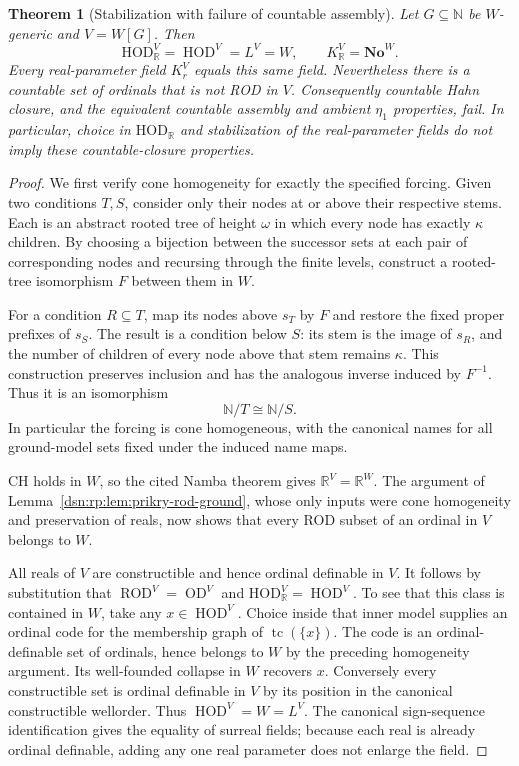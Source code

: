 \documentclass[11pt,a4paper]{article}
\numberwithin{equation}{section}
\newtheorem{theorem}{Theorem}[section]
\theoremstyle{definition}
\theoremstyle{remark}
\newcommand{\No}{\mathbf{No}}
\newcommand{\HOD}{\mathrm{HOD}}
\newcommand{\R}{\mathbb R}
\newcommand{\HR}{\HOD_{\R}}
\newcommand{\KR}{K_{\R}}
\begin{document}
\begin{theorem}[Stabilization with failure of countable assembly]
\label{dsn:rp:thm:namba}
Let $G\subseteq\mathbb N$ be $W$-generic and $V=W[G]$.  Then
\[
 \HR^{V}=\operatorname{HOD}^{V}=L^{V}=W,
 \qquad
 \KR^{V}=\No^{W}.
\]
Every real-parameter field $K_r^V$ equals this same field.  Nevertheless
there is a countable set of ordinals that is not ROD in $V$.
Consequently countable Hahn closure, and the equivalent countable
assembly and ambient $\eta_1$ properties, fail.  In particular,
choice in $\HR$ and stabilization of the real-parameter
fields do not imply these countable-closure properties.
\end{theorem}
\begin{proof}
We first verify cone homogeneity for exactly the specified forcing.
Given two conditions $T,S$, consider only their nodes at or above
their respective stems.  Each is an abstract rooted tree of height
$\omega$ in which every node has exactly $\kappa$ children.  By
choosing a bijection between the successor sets at each pair of
corresponding nodes and recursing through the finite levels, construct
a rooted-tree isomorphism $F$ between them in $W$.

For a condition $R\subseteq T$, map its nodes above $s_T$ by $F$ and
restore the fixed proper prefixes of $s_S$.  The result is a condition
below $S$: its stem is the image of $s_R$, and the number of children
of every node above that stem remains $\kappa$.  This construction
preserves inclusion and has the analogous inverse induced by
$F^{-1}$.  Thus it is an isomorphism
\[
 \mathbb N/T\cong\mathbb N/S.
\]
In particular the forcing is cone homogeneous, with the canonical
names for all ground-model sets fixed under the induced name maps.

CH holds in $W$, so the cited Namba theorem gives
$\mathbb R^V=\mathbb R^W$.  The argument of
Lemma~\ref{dsn:rp:lem:prikry-rod-ground}, whose only inputs were cone
homogeneity and preservation of reals, now shows that every ROD
subset of an ordinal in $V$ belongs to $W$.

All reals of $V$ are constructible and hence ordinal definable in $V$.
It follows by substitution that
$\operatorname{ROD}^{V}=\operatorname{OD}^{V}$ and
$\HR^{V}=\operatorname{HOD}^{V}$.  To see that this class
is contained in $W$, take any $x\in\operatorname{HOD}^{V}$.
Choice inside that inner model supplies an ordinal code for the
membership graph of $\operatorname{tc}(\{x\})$.  The code is an
ordinal-definable set of ordinals, hence belongs to $W$ by the preceding
homogeneity argument.  Its well-founded collapse in $W$ recovers $x$.
Conversely every constructible set is ordinal definable in $V$ by its
position in the canonical constructible wellorder.  Thus
$\operatorname{HOD}^{V}=W=L^V$.  The canonical sign-sequence
identification gives the equality of surreal fields; because each
real is already ordinal definable, adding any one real parameter
does not enlarge the field.


\end{proof}
\end{document}
